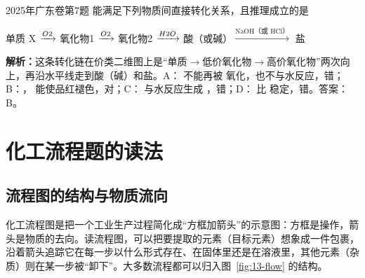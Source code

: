 \begin{zhenti}{2025年广东卷第7题}
能满足下列物质间直接转化关系，且推理成立的是\\
\centerline{单质 X $\xrightarrow{O2}$ 氧化物1 $\xrightarrow{O2}$ 氧化物2 $\xrightarrow{H2O}$ 酸（或碱）$\xrightarrow{\text{NaOH（或 HCl）}}$ 盐}

\textbf{解析：}这条转化链在价类二维图上是“单质$\to$低价氧化物$\to$高价氧化物”两次向上，再沿水平线走到酸（碱）和盐。A： 不能再被  氧化，也不与水反应，错；B：， 能使品红褪色，对；C： 与水反应生成 ，错；D： 比  稳定，错。答案：B。
\end{zhenti}

\section{化工流程题的读法}

\subsection{流程图的结构与物质流向}
化工流程图是把一个工业生产过程简化成“方框加箭头”的示意图：方框是操作，箭头是物质的去向。读流程图，可以把要提取的元素（目标元素）想象成一件包裹，沿着箭头追踪它在每一步以什么形式存在、在固体里还是在溶液里，其他元素（杂质）则在某一步被“卸下”。大多数流程都可以归入图~\ref{fig:13-flow} 的结构。

